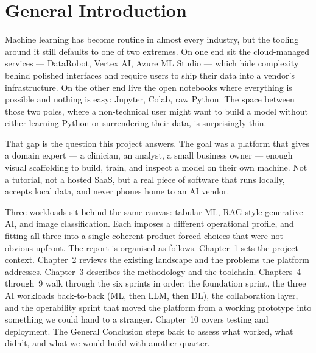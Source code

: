 \documentclass[12pt, a4paper, oneside]{report}
\begin{document}
\tableofcontents
\newpage

\listoffigures
\newpage

\listoftables
\newpage

\chapter*{General Introduction}

Machine learning has become routine in almost every industry, but the
tooling around it still defaults to one of two extremes. On one end sit
the cloud-managed services --- DataRobot, Vertex AI, Azure ML Studio
--- which hide complexity behind polished interfaces and require users
to ship their data into a vendor's infrastructure. On the other end
live the open notebooks where everything is possible and nothing is
easy: Jupyter, Colab, raw Python. The space between those two poles,
where a non-technical user might want to build a model without either
learning Python or surrendering their data, is surprisingly thin.

That gap is the question this project answers. The goal was a platform
that gives a domain expert --- a clinician, an analyst, a small
business owner --- enough visual scaffolding to build, train, and
inspect a model on their own machine. Not a tutorial, not a hosted
SaaS, but a real piece of software that runs locally, accepts local
data, and never phones home to an AI vendor.

Three workloads sit behind the same canvas: tabular ML, RAG-style
generative AI, and image classification. Each imposes a different
operational profile, and fitting all three into a single coherent
product forced choices that were not obvious upfront. The report is
organised as follows. Chapter~1 sets the project context. Chapter~2
reviews the existing landscape and the problems the platform addresses.
Chapter~3 describes the methodology and the toolchain. Chapters~4
through~9 walk through the six sprints in order: the foundation sprint,
the three AI workloads back-to-back (ML, then LLM, then DL), the
collaboration layer, and the operability sprint that moved the
platform from a working prototype into something we could hand to a
stranger. Chapter~10 covers testing and deployment. The General
Conclusion steps back to assess what worked, what didn't, and what we
would build with another quarter.
\end{document}
